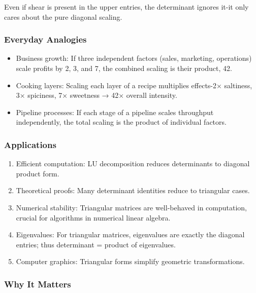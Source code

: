 \documentclass[
  letterpaper,
  DIV=11,
  numbers=noendperiod]{scrreprt}
\providecommand{\tightlist}{%
  \setlength{\itemsep}{0pt}\setlength{\parskip}{0pt}}
\begin{document}
Even if shear is present in the upper entries, the determinant ignores
it-it only cares about the pure diagonal scaling.

\subsubsection{Everyday Analogies}\label{everyday-analogies-50}

\begin{itemize}
\tightlist
\item
  Business growth: If three independent factors (sales, marketing,
  operations) scale profits by 2, 3, and 7, the combined scaling is
  their product, 42.
\item
  Cooking layers: Scaling each layer of a recipe multiplies effects-2×
  saltiness, 3× spiciness, 7× sweetness → 42× overall intensity.
\item
  Pipeline processes: If each stage of a pipeline scales throughput
  independently, the total scaling is the product of individual factors.
\end{itemize}

\subsubsection{Applications}\label{applications-16}

\begin{enumerate}
\def\labelenumi{\arabic{enumi}.}
\tightlist
\item
  Efficient computation: LU decomposition reduces determinants to
  diagonal product form.
\item
  Theoretical proofs: Many determinant identities reduce to triangular
  cases.
\item
  Numerical stability: Triangular matrices are well-behaved in
  computation, crucial for algorithms in numerical linear algebra.
\item
  Eigenvalues: For triangular matrices, eigenvalues are exactly the
  diagonal entries; thus determinant = product of eigenvalues.
\item
  Computer graphics: Triangular forms simplify geometric
  transformations.
\end{enumerate}

\subsubsection{Why It Matters}\label{why-it-matters-50}
\end{document}
